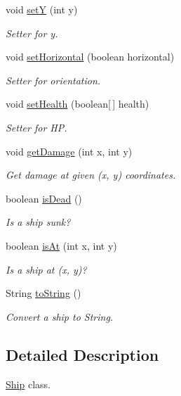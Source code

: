 \begin{DoxyCompactItemize}
void \hyperlink{classShip_a8b4bd2064164d6310f2035249b5c2e8d}{setY} (int y)
\begin{DoxyCompactList}\small\item\em Setter for y. \end{DoxyCompactList}\item 
void \hyperlink{classShip_a170cbc736f06285b709a3d110b0f3da9}{set\+Horizontal} (boolean horizontal)
\begin{DoxyCompactList}\small\item\em Setter for orientation. \end{DoxyCompactList}\item 
void \hyperlink{classShip_af1524176d95bdcd4699606020f491a36}{set\+Health} (boolean\mbox{[}$\,$\mbox{]} health)
\begin{DoxyCompactList}\small\item\em Setter for HP. \end{DoxyCompactList}\item 
void \hyperlink{classShip_ab7049cd23905649a2b382a8e1f022baf}{get\+Damage} (int x, int y)
\begin{DoxyCompactList}\small\item\em Get damage at given (x, y) coordinates. \end{DoxyCompactList}\item 
boolean \hyperlink{classShip_a60e1c5cd27f8779cdd668580bc76fb2f}{is\+Dead} ()
\begin{DoxyCompactList}\small\item\em Is a ship sunk? \end{DoxyCompactList}\item 
boolean \hyperlink{classShip_a4a9ded86f4c02bb9ab8936314dd228aa}{is\+At} (int x, int y)
\begin{DoxyCompactList}\small\item\em Is a ship at (x, y)? \end{DoxyCompactList}\item 
String \hyperlink{classShip_a6fc0a9eec35370be3fa5e0c4efcb041c}{to\+String} ()
\begin{DoxyCompactList}\small\item\em Convert a ship to String. \end{DoxyCompactList}\end{DoxyCompactItemize}


\subsection{Detailed Description}
\hyperlink{classShip}{Ship} class. 

